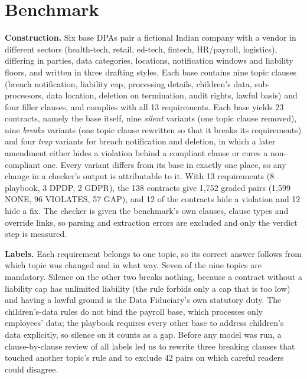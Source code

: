 \documentclass[conference]{IEEEtran}
\begin{document}
\section{Benchmark}

\textbf{Construction.} Six base DPAs pair a fictional Indian company with a vendor in different sectors (health-tech, retail, ed-tech, fintech, HR/payroll, logistics), differing in parties, data categories, locations, notification windows and liability floors, and written in three drafting styles. Each base contains nine topic clauses (breach notification, liability cap, processing details, children's data, sub-processors, data location, deletion on termination, audit rights, lawful basis) and four filler clauses, and complies with all 13 requirements. Each base yields 23 contracts, namely the base itself, nine \emph{silent} variants (one topic clause removed), nine \emph{breaks} variants (one topic clause rewritten so that it breaks its requirements) and four \emph{trap} variants for breach notification and deletion, in which a later amendment either hides a violation behind a compliant clause or cures a non-compliant one. Every variant differs from its base in exactly one place, so any change in a checker's output is attributable to it. With 13 requirements (8 playbook, 3 DPDP, 2 GDPR), the 138 contracts give 1,752 graded pairs (1,599 NONE, 96 VIOLATES, 57 GAP), and 12 of the contracts hide a violation and 12 hide a fix. The checker is given the benchmark's own clauses, clause types and override links, so parsing and extraction errors are excluded and only the verdict step is measured.

\textbf{Labels.} Each requirement belongs to one topic, so its correct answer follows from which topic was changed and in what way. Seven of the nine topics are mandatory. Silence on the other two breaks nothing, because a contract without a liability cap has unlimited liability (the rule forbids only a cap that is too low) and having a lawful ground is the Data Fiduciary's own statutory duty. The children's-data rules do not bind the payroll base, which processes only employees' data; the playbook requires every other base to address children's data explicitly, so silence on it counts as a gap. Before any model was run, a clause-by-clause review of all labels led us to rewrite three breaking clauses that touched another topic's rule and to exclude 42 pairs on which careful readers could disagree.

\end{document}
